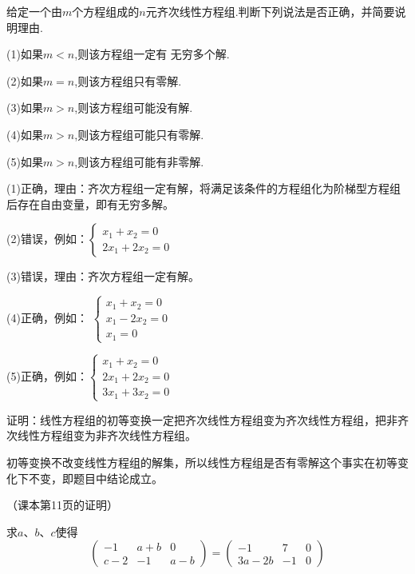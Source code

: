\documentclass[a4paper]{report}
\begin{document}
\EX 给定一个由$m$个方程组成的$n$元齐次线性方程组.判断下列说法是否正确，并简要说明理由.

(1)如果$m< n$,则该方程组一定有 无穷多个解.

(2)如果$m=n$,则该方程组只有零解.

(3)如果$m>n$,则该方程组可能没有解.

(4)如果$m> n$,则该方程组可能只有零解.

(5)如果$m> n$,则该方程组可能有非零解.

\begin{jie}
(1)正确，理由：齐次方程组一定有解，将满足该条件的方程组化为阶梯型方程组后存在自由变量，即有无穷多解。

(2)错误，例如：$
\begin{cases}
x_1+x_2=0\\
2x_1+2x_2=0
\end{cases}
$

(3)错误，理由：齐次方程组一定有解。

(4)正确，例如：
$
\begin{cases}
x_1+x_2=0\\
x_1-2x_2=0\\
x_1=0
\end{cases}
$

(5)正确，例如：$
\begin{cases}
x_1+x_2=0\\
2x_1+2x_2=0\\
3x_1+3x_2=0
\end{cases}
$
\end{jie}

\EX 证明：线性方程组的初等变换一定把齐次线性方程组变为齐次线性方程组，把非齐次线性方程组变为非齐次线性方程组。

\begin{zhengming}
初等变换不改变线性方程组的解集，所以线性方程组是否有零解这个事实在初等变化下不变，即题目中结论成立。

（课本第11页的证明）
\end{zhengming}

\EX 求$a$、$b$、$c$使得
\begin{equation*}
\begin{pmatrix}
-1&a+b&0\\ c-2&-1&a-b
\end{pmatrix}=\begin{pmatrix}
-1&7&0\\ 3a-2b&-1&0
\end{pmatrix}
\end{equation*}
\end{document}
